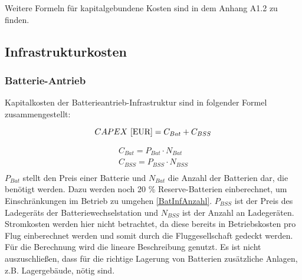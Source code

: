 Weitere Formeln für kapitalgebundene Kosten sind in dem Anhang A1.2 zu finden.
%
\subsection{Infrastrukturkosten}

\subsubsection{Batterie-Antrieb}
Kapitalkosten der Batterieantrieb-Infrastruktur sind in folgender Formel zusammengestellt:

\begin{equation}
     {CAPEX ~[\text{EUR}]} = C_{Bat} + C_{BSS} \\ %
     \label{BA_Infrastruktur}
  \end{equation}

\begin{equation}
   \begin{split}
  {C_{Bat}} = P_{Bat} \cdot N_{Bat}  \\
  {C_{BSS}} = P_{BSS} \cdot N_{BSS} \\
  \label{BA_zusatz}
   \end{split}
  \end{equation}
%
$P_{Bat}$ stellt den Preis einer Batterie und $N_{Bat}$ die Anzahl der Batterien dar, die benötigt werden. 
Dazu werden noch 20 \% Reserve-Batterien einberechnet, um Einschränkungen im Betrieb zu umgehen \eqref{BatInfAnzahl}. 
$P_{BSS}$ ist der Preis des Ladegeräts der Batteriewechselstation und $N_{BSS}$ ist der Anzahl an Ladegeräten. 
Stromkosten werden hier nicht betrachtet, da diese bereits in Betriebskosten 
pro Flug einberechnet werden und somit durch die Fluggesellschaft gedeckt werden. 
Für die Berechnung wird die lineare Beschreibung genutzt. 
Es ist nicht auszuschließen, dass für die richtige Lagerung 
von Batterien zusätzliche Anlagen, z.B. Lagergebäude, nötig sind.
  
